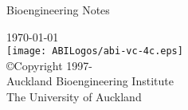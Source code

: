 \thispagestyle{empty}

\begin{center}
   \huge Bioengineering Notes
   \vspace{110mm}   

   \normalsize   
   \today\\   %

   \large
   \vspace{30mm}
   \texttt{[image: ABILogos/abi-vc-4c.eps]}\\   
   \vspace{10mm}
   \small
   \copyright \thickspace Copyright 1997-\the\year \\
   Auckland Bioengineering Institute\\
   The University of Auckland
\end{center}
